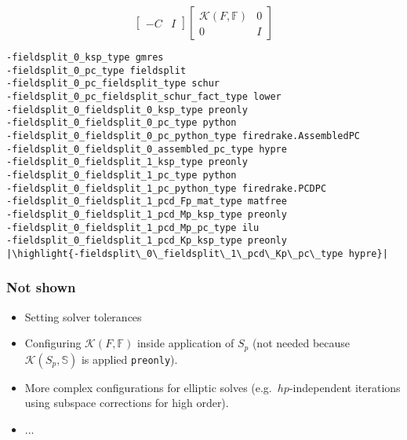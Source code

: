 \documentclass[presentation]{beamer}
\newcommand{\KSP}[2]{\ensuremath{\mathcal{K}\left(#1, \mathbb{#2}\right)}}
\newcommand{\ksp}[1]{\KSP{#1}{#1}}
\newcommand{\highlight}[1]{\colorbox{red!20}{\color{black} #1}}
\begin{document}
\begin{frame}[fragile]
\begin{onlyenv}
\begin{equation*}
{\begin{bmatrix}
        -C & I
      \end{bmatrix}
      \begin{bmatrix}
        \ksp{F} & 0 \\
        0 & I
      \end{bmatrix}}
    \end{equation*}
\begin{verbatim}
-fieldsplit_0_ksp_type gmres
-fieldsplit_0_pc_type fieldsplit
-fieldsplit_0_pc_fieldsplit_type schur
-fieldsplit_0_pc_fieldsplit_schur_fact_type lower
-fieldsplit_0_fieldsplit_0_ksp_type preonly
-fieldsplit_0_fieldsplit_0_pc_type python
-fieldsplit_0_fieldsplit_0_pc_python_type firedrake.AssembledPC
-fieldsplit_0_fieldsplit_0_assembled_pc_type hypre
-fieldsplit_0_fieldsplit_1_ksp_type preonly
-fieldsplit_0_fieldsplit_1_pc_type python
-fieldsplit_0_fieldsplit_1_pc_python_type firedrake.PCDPC
-fieldsplit_0_fieldsplit_1_pcd_Fp_mat_type matfree
-fieldsplit_0_fieldsplit_1_pcd_Mp_ksp_type preonly
-fieldsplit_0_fieldsplit_1_pcd_Mp_pc_type ilu
-fieldsplit_0_fieldsplit_1_pcd_Kp_ksp_type preonly
|\highlight{-fieldsplit\_0\_fieldsplit\_1\_pcd\_Kp\_pc\_type hypre}|
\end{verbatim}
  \end{onlyenv}
\end{frame}

\begin{frame}
  \frametitle{Not shown}
  \begin{itemize}
  \item Setting solver tolerances
  \item Configuring $\ksp{F}$ inside application of $S_p$ (not
    needed because $\KSP{S_p}{S}$ is applied \texttt{preonly}).
  \item More complex configurations for elliptic solves
    (e.g.~$hp$-independent iterations using subspace corrections
    for high order).
  \item ...
  \end{itemize}
\end{frame}
\end{document}
